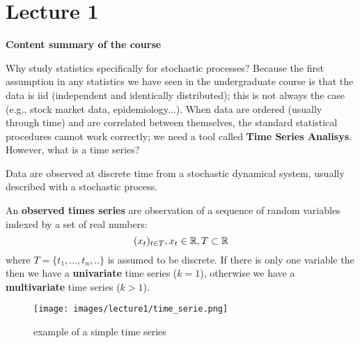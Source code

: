 \section{Lecture 1}
\label{lecture1}

\begin{center}
    \textbf{Content summary of the course}
\end{center}

Why study statistics specifically for stochastic processes? Because the first assumption in any statistics we have seen in the undergraduate course is that the data is iid (independent and identically distributed); this is not always the case (e.g., stock market data, epidemiology...). When data are ordered (usually through time) and are correlated between themselves, the standard statistical procedures cannot work correctly; we need a tool called \textbf{Time Series Analisys}. However, what is a time series?

Data are observed at discrete time from a stochastic dynamical system, usually described with a stochastic process.
\begin{definition}
    An \textbf{observed times series} are observation of a sequence of random variables indexed by a set of real numbers:
    \[ 
        (x_t)_{t\in{T}}, x_t \in \mathbb{R}, T \subset \mathbb{R}
    \]
    where $T=\{t_1, ..., t_n, ..\}$ is assumed to be discrete. If there is only one variable the then we have a \textbf{univariate} time series ($k=1$), otherwise we have a \textbf{multivariate} time series ($k>1$).
\end{definition}

\begin{figure}[htbp]
    \centering
    \texttt{[image: images/lecture1/time\_serie.png]}
    \caption{example of a simple time series}
\end{figure}

